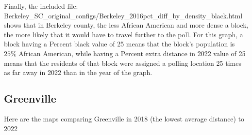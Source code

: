 \documentclass[11pt]{article}
\theoremstyle{remark}
\theoremstyle{definition}
\begin{document}
Finally, the included file: \textrm{Berkeley\_SC\_original\_configs/Berkeley\_2016pct\_diff\_by\_density\_black.html} shows that in Berkeley county, the less African American and more dense a block, the more likely that it would have to travel further to the poll. For this graph, a block having a Percent black value of 25 means that the block's population is $25\%$ African American, while having a Percent extra distance in 2022 value of 25 means that the residents of that block were assigned a polling location 25 times as far away in 2022 than in the year of the graph.

\subsection{Greenville} 
Here are the maps comparing Greenville in 2018 (the lowest average distance) to 2022
\end{document}

